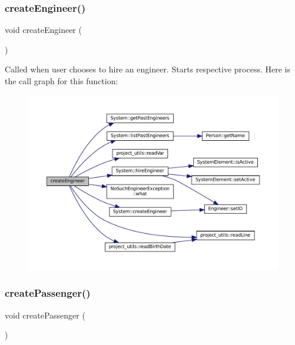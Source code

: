 \subsubsection{\texorpdfstring{create\+Engineer()}{createEngineer()}}
{\footnotesize\ttfamily void create\+Engineer (\begin{DoxyParamCaption}{ }\end{DoxyParamCaption})}

Called when user chooses to hire an engineer. Starts respective process. Here is the call graph for this function\+:
\nopagebreak
\begin{figure}[H]
\begin{center}
\leavevmode
\includegraphics[width=350pt]{Train-System_8cpp_a5dc3267477bbb266c4465f2a1ac03acd_cgraph}
\end{center}
\end{figure}
\mbox{\label{Train-System_8cpp_ab7588618ce8693be3c5cbfdd2e5d9f41}} 
\subsubsection{\texorpdfstring{create\+Passenger()}{createPassenger()}}
{\footnotesize\ttfamily void create\+Passenger (\begin{DoxyParamCaption}{ }\end{DoxyParamCaption})}

